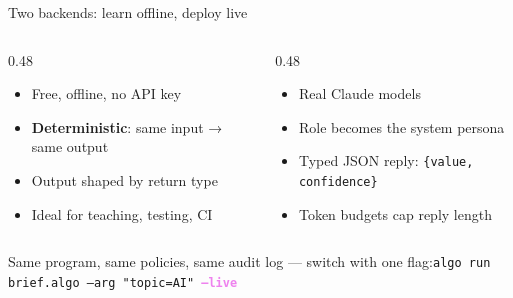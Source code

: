\documentclass[aspectratio=169,11pt]{beamer}
\begin{document}
\begin{frame}{Two backends: learn offline, deploy live}
\vspace{1mm}
\begin{columns}[T]
\begin{column}{0.48\textwidth}
\begin{tcolorbox}[enhanced,colback=leaf!8,colframe=leaf,arc=3pt,title={\bfseries Mock (default)},colbacktitle=leaf,fontupper=\small]
\begin{itemize}
  \item Free, offline, no API key
  \item \textbf{Deterministic}: same input → same output
  \item Output shaped by return type
  \item Ideal for teaching, testing, CI
\end{itemize}
\end{tcolorbox}
\end{column}
\begin{column}{0.48\textwidth}
\begin{tcolorbox}[enhanced,colback=violet!8,colframe=violet,arc=3pt,title={\bfseries Live (\texttt{--live})},colbacktitle=violet,fontupper=\small]
\begin{itemize}
  \item Real Claude models
  \item Role becomes the system persona
  \item Typed JSON reply: \texttt{\{value, confidence\}}
  \item Token budgets cap reply length
\end{itemize}
\end{tcolorbox}
\end{column}
\end{columns}
\vspace{2mm}
\centering\small
Same program, same policies, same audit log --- switch with one flag:\enspace \texttt{algo run brief.algo --arg "topic=AI" \textcolor{violet}{\textbf{--live}}}
\end{frame}

\end{document}
